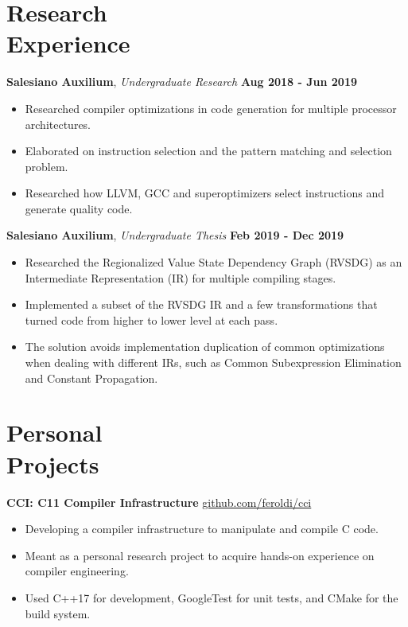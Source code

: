 \documentclass[margin,line]{resume}
\begin{document}
\begin{resume}
    \section{\mysidestyle Research\\Experience}

    \textbf{Salesiano Auxilium}, \textsl{Undergraduate Research} \hfill \textbf{Aug 2018 - Jun 2019}
    \begin{itemize}
        \item Researched compiler optimizations in code generation for multiple processor architectures.
        \item Elaborated on instruction selection and the pattern matching and selection problem.
        \item Researched how LLVM, GCC and superoptimizers select instructions and generate quality code.
    \end{itemize}

    \textbf{Salesiano Auxilium}, \textsl{Undergraduate Thesis} \hfill \textbf{Feb 2019 - Dec 2019}
    \begin{itemize}
        \item Researched the Regionalized Value State Dependency Graph (RVSDG) as an Intermediate Representation (IR) for multiple compiling stages.
        \item Implemented a subset of the RVSDG IR and a few transformations that turned code from higher to lower level at each pass.
        \item The solution avoids implementation duplication of common optimizations when dealing with different IRs, such as Common Subexpression Elimination and Constant Propagation.
    \end{itemize}

    \section{\mysidestyle Personal\\Projects}

    \textbf{CCI: C11 Compiler Infrastructure} \hfill \url{github.com/feroldi/cci}
    \begin{itemize}
        \item Developing a compiler infrastructure to manipulate and compile C code.
        \item Meant as a personal research project to acquire hands-on experience on compiler engineering.
        \item Used C++17 for development, GoogleTest for unit tests, and CMake for the build system.
    \end{itemize}


\end{resume}
\end{document}
